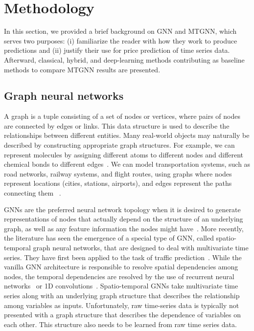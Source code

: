 \section{Methodology}
\label{sec:methodology}
In this section, we provided a brief background on GNN and MTGNN, which serves two purposes: (i) familiarize the reader with how they work to produce predictions and 
(ii) justify their use for price prediction of time series data.  Afterward, classical, hybrid, and deep-learning methods contributing as baseline methods to compare MTGNN results are presented.

\subsection{Graph neural networks}
\label{ssec:gnn}

A graph is a tuple consisting of a set of nodes or vertices, where pairs of nodes are connected by 
edges or links. This data structure is used to describe the relationships between different
entities. Many real-world objects may naturally be described by constructing appropriate graph 
structures. For example, we can represent molecules by assigning different atoms to different nodes and different chemical bonds to different edges~\citep{prince2023understanding}. We can model transportation systems, such as road networks, railway systems, and flight routes, using graphs where nodes represent locations (cities, stations, airports), and edges represent the paths connecting them ~\citep{rahmani2023graph}.

GNNs are the preferred neural network topology when it is desired to generate representations of nodes
that actually depend on the structure of an underlying graph, as well as any feature information
the nodes might have~\citep{hamilton2020graph}. More recently, the literature has seen the emergence of a
special type of GNN, called spatio-temporal graph neural networks, that are designed to deal with
multivariate time series. They have first been applied to the task of traffic
prediction~\citep{chen2020multi,li2017diffusion,wu2019graph,yu2017spatio,zheng2020gman}. While the vanilla 
GNN architecture is responsible to resolve spatial dependencies among nodes, the temporal dependencies 
are resolved by the use of recurrent neural networks~\citep{li2017diffusion,seo2018structured} or 1D 
convolutions~\citep{yan2018spatial,yu2017spatio}. Spatio-temporal GNNs take multivariate time series along
with an underlying graph structure that describes the relationship among variables as inputs. Unfortunately, 
raw time-series data is typically not presented with a graph structure that describes the dependence of
variables on each other. This structure also needs to be learned from raw time series data.

